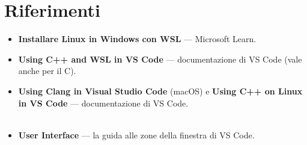 \section{Riferimenti}

\begin{itemize}
  \item \textbf{Installare Linux in Windows con WSL} --- Microsoft Learn. \\
  \item \textbf{Using C++ and WSL in VS Code} --- documentazione di VS Code
        (vale anche per il C). \\
  \item \textbf{Using Clang in Visual Studio Code} (macOS) e \textbf{Using
        C++ on Linux in VS Code} --- documentazione di VS Code. \\
         \\
  \item \textbf{User Interface} --- la guida alle zone della finestra di
        VS Code. \\
\end{itemize}
